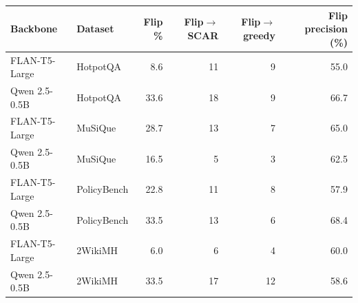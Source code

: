 \begin{tabular}{llrrrr}
\toprule
Backbone & Dataset & Flip \% & Flip$\rightarrow$SCAR & Flip$\rightarrow$greedy & Flip precision (\%) \\
\midrule
FLAN-T5-Large & HotpotQA & 8.6 & 11 & 9 & 55.0 \\
Qwen 2.5-0.5B & HotpotQA & 33.6 & 18 & 9 & 66.7 \\
FLAN-T5-Large & MuSiQue & 28.7 & 13 & 7 & 65.0 \\
Qwen 2.5-0.5B & MuSiQue & 16.5 & 5 & 3 & 62.5 \\
FLAN-T5-Large & PolicyBench & 22.8 & 11 & 8 & 57.9 \\
Qwen 2.5-0.5B & PolicyBench & 33.5 & 13 & 6 & 68.4 \\
FLAN-T5-Large & 2WikiMH & 6.0 & 6 & 4 & 60.0 \\
Qwen 2.5-0.5B & 2WikiMH & 33.5 & 17 & 12 & 58.6 \\
\bottomrule
\end{tabular}